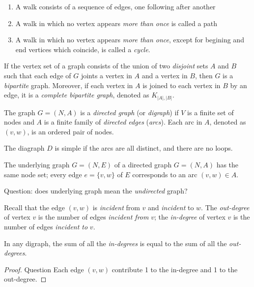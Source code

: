 \begin{definition}
\begin{enumerate}
\item
A walk consists of a sequence of edges, one following after another
\item
A walk in which no vertex appears \emph{more than once} is called a path
\item
A walk in which no vertex appears \emph{more than once}, except for begining and end vertices which coincide, is called a \emph{cycle}.
\end{enumerate}
\end{definition}

\begin{definition}[Bipartite]
If the vertex set of a graph consists of the union of two \emph{disjoint} sets $A$ and $B$ such that each edge of $G$ joints a vertex in $A$ and a vertex in $B$, then $G$ is a \emph{bipartite} graph.
Moreover, if each vertex in $A$ is joined to each vertex in $B$ by an edge, it is a \emph{complete bipartite graph}, denoted as $K_{|A|,|B|}$.
\end{definition}

\begin{definition}
The graph $G=(N,A)$ is a \emph{directed graph} (or \emph{digraph}) if $V$ is a finite set of nodes and $A$ is a finite family of \emph{directed edges} (\emph{arcs}).
Each arc in $A$, denoted as $(v,w)$, is an ordered pair of nodes.

The diagraph $D$ is simple if the arcs are all distinct, and there are no loops.
\end{definition}
\begin{definition}
The underlying graph $G = (N,E)$ of a directed graph $G = (N,A)$ has the same node set; 
every edge $e = \{v,w\}$ of $E$ corresponds to an arc $(v,w)\in A$.

Question: does underlying graph mean the \emph{undirected} graph?
\end{definition}

\begin{definition}
Recall that the edge $(v,w)$ is \emph{incident} from $v$ and \emph{incident} to $w$.
The \emph{out-degree} of vertex $v$ is the number of edges \emph{incident from} $v$;
the \emph{in-degree} of vertex $v$ is the number of edges \emph{incident to} $v$.
\end{definition}
\begin{theorem}
In any digraph, the sum of all the \emph{in-degrees} is equal to the sum of all the \emph{out-degrees}.
\end{theorem}
\begin{proof}
Question
Each edge $(v,w)$ contribute 1 to the in-degree and 1 to the out-degree.
\end{proof}

